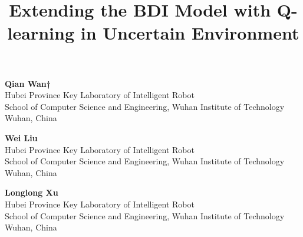 \documentclass{article}
\title{\textbf{Extending the BDI Model with Q-learning in Uncertain
Environment}}
\date{}
\begin{document}
\maketitle
\centering
\begin{multicols}{3}
\textbf{Qian Wan†} \\
  Hubei Province Key Laboratory of Intelligent Robot\\
  School of Computer Science and Engineering, Wuhan Institute of Technology\\
  Wuhan, China
\vfill\columnbreak

\textbf{Wei Liu} \\
  Hubei Province Key Laboratory of Intelligent Robot\\
  School of Computer Science and Engineering, Wuhan Institute of Technology\\
  Wuhan, China
\vfill\columnbreak

\textbf{Longlong Xu} \\
  Hubei Province Key Laboratory of Intelligent Robot\\
  School of Computer Science and Engineering, Wuhan Institute of Technology\\
  Wuhan, China

\end{multicols}
\justify
\end{document}
